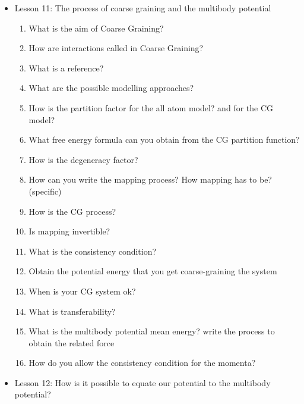 {\begin{itemize}
\begin{enumerate}
        \item What is the meaning of defocusing? How can defocusing be done?
        \item What is a projection operator?
        \item How are the partition function and the free energy after defocusing?
        \item What happens when you defocus your system in terms of entropy? And what free energy do you obtain?
        \item What happens to a correlation function at each step if not on a critical point? what if on a critical point?
    \end{enumerate}
    \item Lesson 11: The process of coarse graining and the multibody potential
    \begin{enumerate}
        \item What is the aim of Coarse Graining?
        \item How are interactions called in Coarse Graining?
        \item What is a reference?
        \item What are the possible modelling approaches?
        \item How is the partition factor for the all atom model? and for the CG model?
        \item What free energy formula can you obtain from the CG partition function?
        \item How is the degeneracy factor?
        \item How can you write the mapping process? How mapping has to be? (specific)
        \item How is the CG process?
        \item Is mapping invertible?
        \item What is the consistency condition?
        \item Obtain the potential energy that you get coarse-graining the system
        \item When is your CG system ok?
        \item What is transferability?
        \item What is the multibody potential mean energy? write the process to obtain the related force
        \item How do you allow the consistency condition for the momenta?
    \end{enumerate}
    \item Lesson 12: How is it possible to equate our potential to the multibody potential?

\end{itemize}}
